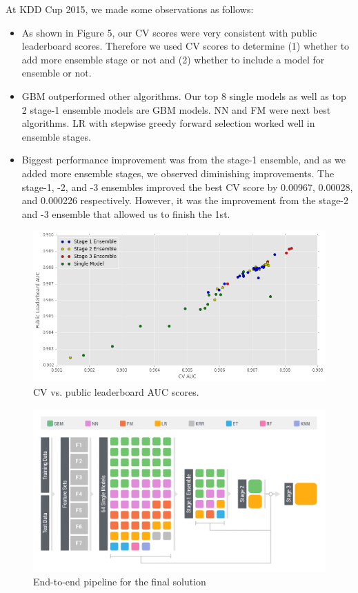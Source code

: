 At KDD Cup 2015, we made some observations as follows:
\begin{itemize}
\setlength\itemsep{0em}
\item As shown in Figure 5, our CV scores were very consistent with public leaderboard scores.  Therefore we used CV scores to determine (1) whether to add more ensemble stage or not and (2) whether to include a model for ensemble or not.
\item GBM outperformed other algorithms.  Our top 8 single models as well as top 2 stage-1 ensemble models are GBM models.  NN and FM were next best algorithms.  LR with stepwise greedy forward selection worked well in ensemble stages.
\item Biggest performance improvement was from the stage-1 ensemble, and as we added more ensemble stages, we observed diminishing improvements.  The stage-1, -2, and -3 ensembles improved the best CV score by 0.00967, 0.00028, and 0.000226 respectively.  However, it was the improvement from the stage-2 and -3 ensemble that allowed us to finish the 1st.
\end{itemize}

\begin{figure}[t]
  \centering
    \includegraphics[width=0.5 \textwidth]{cv_lb}
      \caption{CV vs. public leaderboard AUC scores.}
\end{figure}

\begin{figure}[!t]
  \centering
    \includegraphics[width=0.5 \textwidth]{ensemble}
      \caption{End-to-end pipeline for the final solution}
\end{figure}

